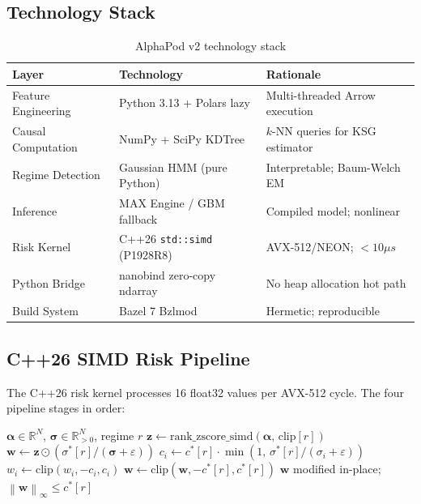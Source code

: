 \documentclass[12pt,a4paper]{article}
\newcommand{\R}{\mathbb{R}}
\newcommand{\norm}[1]{\left\lVert#1\right\rVert}
\newcommand{\bm}[1]{\boldsymbol{#1}}
\begin{document}
\subsection{Technology Stack}

\begin{table}[h]
\centering
\caption{AlphaPod v2 technology stack}
\label{tab:stack}
\begin{tabular}{lll}
\toprule
\textbf{Layer} & \textbf{Technology} & \textbf{Rationale} \\
\midrule
Feature Engineering & Python 3.13 + Polars lazy & Multi-threaded Arrow execution \\
Causal Computation & NumPy + SciPy KDTree & $k$-NN queries for KSG estimator \\
Regime Detection & Gaussian HMM (pure Python) & Interpretable; Baum-Welch EM \\
Inference & MAX Engine / GBM fallback & Compiled model; nonlinear \\
Risk Kernel & C++26 \texttt{std::simd} (P1928R8) & AVX-512/NEON; $<10\mu s$ \\
Python Bridge & nanobind zero-copy ndarray & No heap allocation hot path \\
Build System & Bazel 7 Bzlmod & Hermetic; reproducible \\
\bottomrule
\end{tabular}
\end{table}

\subsection{C++26 SIMD Risk Pipeline}

The C++26 risk kernel processes 16 float32 values per AVX-512 cycle.
The four pipeline stages in order:

\begin{algorithm}
\caption{C++26 SIMD Risk Pipeline}
\begin{algorithmic}[1]
\Require $\bm{\alpha} \in \R^N$, $\bm{\sigma} \in \R^N_{>0}$, regime $r$
\State $\bm{z} \leftarrow \mathrm{rank\_zscore\_simd}(\bm{\alpha},\, \text{clip}[r])$
\State $\bm{w} \leftarrow \bm{z} \odot (\sigma^*[r] / (\bm{\sigma} + \varepsilon))$
    \State $c_i \leftarrow c^*[r] \cdot \min(1,\, \sigma^*[r] / (\sigma_i + \varepsilon))$
    \State $w_i \leftarrow \mathrm{clip}(w_i, -c_i, c_i)$
\EndFor
\State $\bm{w} \leftarrow \mathrm{clip}(\bm{w}, -c^*[r], c^*[r])$ 
\Ensure $\bm{w}$ modified in-place; $\norm{\bm{w}}_\infty \leq c^*[r]$
\end{algorithmic}
\end{algorithm}
\end{document}
